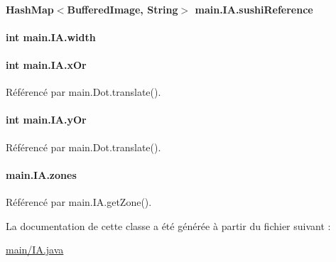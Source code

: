 \paragraph[{sushi\+Reference}]{\setlength{\rightskip}{0pt plus 5cm}Hash\+Map$<$Buffered\+Image, String$>$ main.\+I\+A.\+sushi\+Reference\hspace{0.3cm}{\ttfamily [private]}}\label{classmain_1_1IA_a0c7ba08450493f98e01cf13812b24bda}
\hypertarget{classmain_1_1IA_a6dea592dda2d0384f60ac162899af281}{}
\paragraph[{width}]{\setlength{\rightskip}{0pt plus 5cm}int main.\+I\+A.\+width\hspace{0.3cm}{\ttfamily [private]}}\label{classmain_1_1IA_a6dea592dda2d0384f60ac162899af281}
\hypertarget{classmain_1_1IA_a6c2449fa683b089211b6ca7a8d062b6f}{}
\paragraph[{x\+Or}]{\setlength{\rightskip}{0pt plus 5cm}int main.\+I\+A.\+x\+Or\hspace{0.3cm}{\ttfamily [static]}}\label{classmain_1_1IA_a6c2449fa683b089211b6ca7a8d062b6f}


Référencé par main.\+Dot.\+translate().

\hypertarget{classmain_1_1IA_a7524049aa635b4a3014aeda29b3735af}{}
\paragraph[{y\+Or}]{\setlength{\rightskip}{0pt plus 5cm}int main.\+I\+A.\+y\+Or\hspace{0.3cm}{\ttfamily [static]}}\label{classmain_1_1IA_a7524049aa635b4a3014aeda29b3735af}


Référencé par main.\+Dot.\+translate().

\hypertarget{classmain_1_1IA_aec81fc287caaa8d7190eb8b5d94e7db5}{}
\paragraph[{zones}]{ main.\+I\+A.\+zones\hspace{0.3cm}{\ttfamily [private]}}\label{classmain_1_1IA_aec81fc287caaa8d7190eb8b5d94e7db5}


Référencé par main.\+I\+A.\+get\+Zone().



La documentation de cette classe a été générée à partir du fichier suivant \+:\begin{DoxyCompactItemize}
\item 
\hyperlink{main_2IA_8java}{main/\+I\+A.\+java}\end{DoxyCompactItemize}
